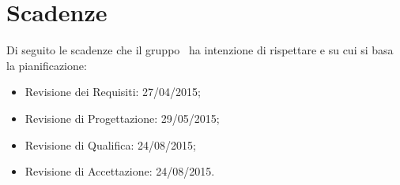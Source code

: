 \section{Scadenze}{
\label{sec:scadenze}
Di seguito le scadenze che il gruppo \gruppo\ ha intenzione di rispettare e su cui si basa la pianificazione:
\begin{itemize}
	\item Revisione dei Requisiti: 27/04/2015;
	\item Revisione di Progettazione: 29/05/2015;
	\item Revisione di Qualifica: 24/08/2015;
	\item Revisione di Accettazione: 24/08/2015.
\end{itemize}
}